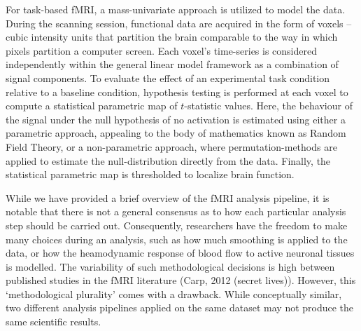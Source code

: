 For task-based fMRI, a mass-univariate approach is utilized to model the data. During the scanning session, functional data are acquired in the form of voxels -- cubic intensity units that partition the brain comparable to the way in which pixels partition a computer screen. Each voxel's time-series is considered independently within the general linear model framework as a combination of signal components. To evaluate the effect of an experimental task condition relative to a baseline condition, hypothesis testing is performed at each voxel to compute a statistical parametric map of $t$-statistic values. Here, the behaviour of the signal under the null hypothesis of no activation is estimated using either a parametric approach, appealing to the body of mathematics known as Random Field Theory, or a non-parametric approach, where permutation-methods are applied to estimate the null-distribution directly from the data. Finally, the statistical parametric map is thresholded to localize brain function. 

While we have provided a brief overview of the fMRI analysis pipeline, it is notable that there is not a general consensus as to how each particular analysis step should be carried out. Consequently, researchers have the freedom to make many choices during an analysis, such as how much smoothing is applied to the data, or how the heamodynamic response of blood flow to active neuronal tissues is modelled. The variability of such methodological decisions is high between published studies in the fMRI literature (Carp, 2012 (secret lives)). However, this `methodological plurality' comes with a drawback. While conceptually similar, two different analysis pipelines applied on the same dataset may not produce the same scientific results. 